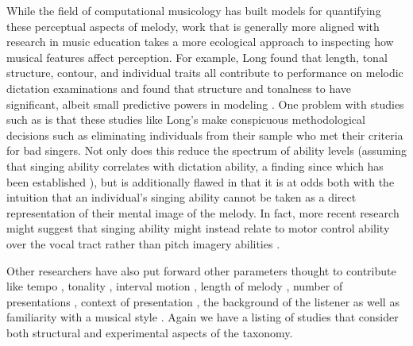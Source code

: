 \documentclass[]{book}
\begin{document}
While the field of computational musicology has built models for quantifying these perceptual aspects of melody, work that is generally more aligned with research in music education takes a more ecological approach to inspecting how musical features affect perception.
For example, Long found that length, tonal structure, contour, and individual traits all contribute to performance on melodic dictation examinations and found that structure and tonalness to have significant, albeit small predictive powers in modeling \citep{longRelationshipsPitchMemory1977}.
One problem with studies such as \citet{longRelationshipsPitchMemory1977} is that these studies like Long's make conspicuous methodological decisions such as eliminating individuals from their sample who met their criteria for bad singers.
Not only does this reduce the spectrum of ability levels (assuming that singing ability correlates with dictation ability, a finding since which has been established \citep{norrisRelationshipSightSinging2003}), but is additionally flawed in that it is at odds both with the intuition that an individual's singing ability cannot be taken as a direct representation of their mental image of the melody.
In fact, more recent research might suggest that singing ability might instead relate to motor control ability over the vocal tract rather than pitch imagery abilities \citep{pfordresherPoorPitchSingingAbsence2007}.

Other researchers have also put forward other parameters thought to contribute like tempo \citep{hofstetterComputerBaesedRecognitionPerceptual1981}, tonality \citep{dowlingScaleContourTwo1978, longRelationshipsPitchMemory1977, pembrookInterferenceTranscriptionProcess1986, ouraMemoryMelodiesSubjects1988}, interval motion \citep{ortmannTonalDeterminantsMelodic1933, pembrookInterferenceTranscriptionProcess1986}, length of melody \citep{longRelationshipsPitchMemory1977, pembrookInterferenceTranscriptionProcess1986}, number of presentations \citep{hofstetterComputerBaesedRecognitionPerceptual1981, pembrookInterferenceTranscriptionProcess1986},
context of presentation \citep{schellenbergEffectTonalRhythmicContext1985},
the background of the listener \citep{longRelationshipsPitchMemory1977, ouraMemoryMelodiesSubjects1988, schellenbergEffectTonalRhythmicContext1985, taylorStrategiesMemoryShort1983} as well as familiarity with a musical style \citep{schellenbergEffectTonalRhythmicContext1985}.
Again we have a listing of studies that consider both structural and experimental aspects of the taxonomy.
\end{document}
